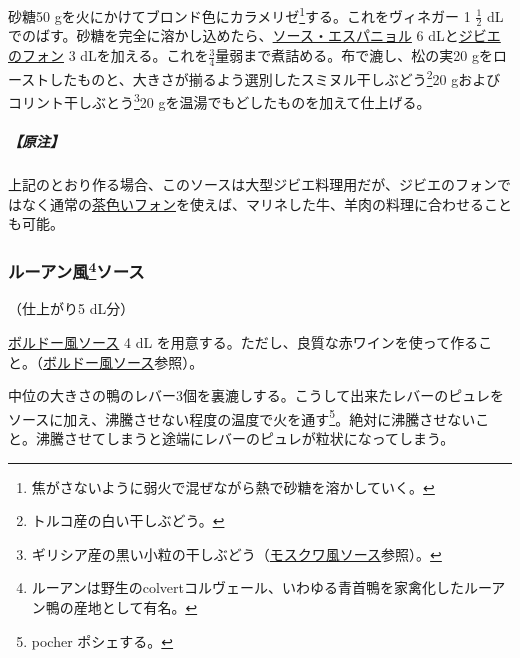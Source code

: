 \begin{recette}

 

砂糖50 gを火にかけてブロンド色にカラメリゼ\footnote{焦がさないように弱火で混ぜながら熱で砂糖を溶かしていく。}する。これをヴィネガー
1 \(\frac{1}{2}\)
dLでのばす。砂糖を完全に溶かし込めたら、\protect\hyperlink{sauce-espagnole}{ソース・エスパニョル}
6 dLと\protect\hyperlink{fonds-de-gibier}{ジビエのフォン} 3
dLを加える。これを\(\frac{3}{4}\)量弱まで煮詰める。布で漉し、松の実20
gをローストしたものと、大きさが揃るよう選別したスミヌル干しぶどう\footnote{トルコ産の白い干しぶどう。}20
gおよびコリント干しぶとう\footnote{ギリシア産の黒い小粒の干しぶどう（\protect\hyperlink{sauce-moscovite}{モスクワ風ソース}参照）。}20
gを温湯でもどしたものを加えて仕上げる。

\hypertarget{nota-sauce-romaine}{%
\subparagraph{【原注】}\label{nota-sauce-romaine}}

上記のとおり作る場合、このソースは大型ジビエ料理用だが、ジビエのフォンではなく通常の\protect\hyperlink{fonds-brun}{茶色いフォン}を使えば、マリネした牛、羊肉の料理に合わせることも可能。

\atoaki{}

\hypertarget{sauce-rouennaise}{%
\subsubsection[ルーアン風ソース]{\texorpdfstring{ルーアン風\footnote{ルーアンは野生のcolvertコルヴェール、いわゆる青首鴨を家禽化したルーアン鴨の産地として有名。}ソース}{ルーアン風ソース}}\label{sauce-rouennaise}}


 

（仕上がり5 dL分）

\protect\hyperlink{sauce-bordelaise}{ボルドー風ソース} 4 dL
を用意する。ただし、良質な赤ワインを使って作ること。（\protect\hyperlink{sauce-bordelaise}{ボルドー風ソース}参照）。

中位の大きさの鴨のレバー3個を裏漉しする。こうして出来たレバーのピュレをソースに加え、沸騰させない程度の温度で火を通す\footnote{pocher
  ポシェする。}。絶対に沸騰させないこと。沸騰させてしまうと途端にレバーのピュレが粒状になってしまう。


\end{recette}
